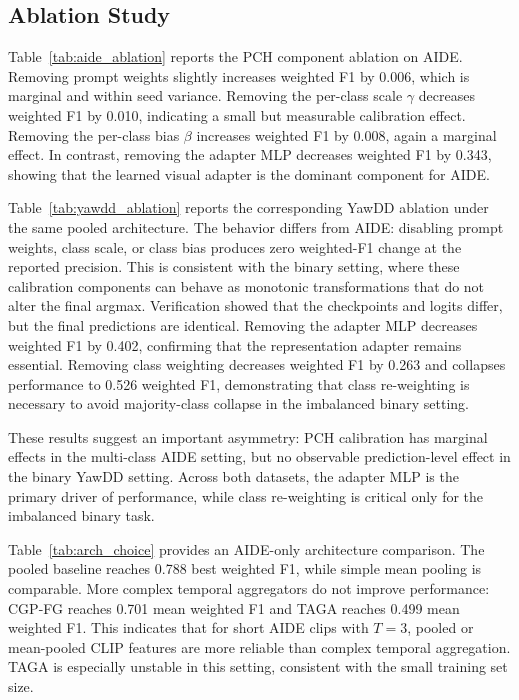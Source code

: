 \subsection{Ablation Study}
\label{sec:ablation_study}

Table~\ref{tab:aide_ablation} reports the PCH component ablation on AIDE. Removing prompt weights slightly increases weighted F1 by 0.006, which is marginal and within seed variance. Removing the per-class scale $\gamma$ decreases weighted F1 by 0.010, indicating a small but measurable calibration effect. Removing the per-class bias $\beta$ increases weighted F1 by 0.008, again a marginal effect. In contrast, removing the adapter MLP decreases weighted F1 by 0.343, showing that the learned visual adapter is the dominant component for AIDE.

Table~\ref{tab:yawdd_ablation} reports the corresponding YawDD ablation under the same pooled architecture. The behavior differs from AIDE: disabling prompt weights, class scale, or class bias produces zero weighted-F1 change at the reported precision. This is consistent with the binary setting, where these calibration components can behave as monotonic transformations that do not alter the final argmax. Verification showed that the checkpoints and logits differ, but the final predictions are identical. Removing the adapter MLP decreases weighted F1 by 0.402, confirming that the representation adapter remains essential. Removing class weighting decreases weighted F1 by 0.263 and collapses performance to 0.526 weighted F1, demonstrating that class re-weighting is necessary to avoid majority-class collapse in the imbalanced binary setting.

These results suggest an important asymmetry: PCH calibration has marginal effects in the multi-class AIDE setting, but no observable prediction-level effect in the binary YawDD setting. Across both datasets, the adapter MLP is the primary driver of performance, while class re-weighting is critical only for the imbalanced binary task.

Table~\ref{tab:arch_choice} provides an AIDE-only architecture comparison. The pooled baseline reaches 0.788 best weighted F1, while simple mean pooling is comparable. More complex temporal aggregators do not improve performance: CGP-FG reaches 0.701 mean weighted F1 and TAGA reaches 0.499 mean weighted F1. This indicates that for short AIDE clips with $T=3$, pooled or mean-pooled CLIP features are more reliable than complex temporal aggregation. TAGA is especially unstable in this setting, consistent with the small training set size.

